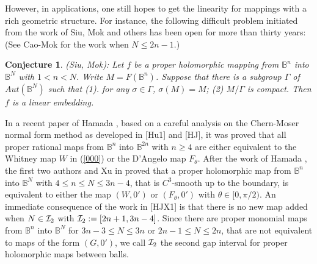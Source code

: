 \documentclass[12pt]{article}
\numberwithin{equation}{section}
\def\BB{{\mathbb B}}
\newtheorem{conjecture}[theorem]{Conjecture}
\begin{document}
However, in  applications,  one  still hopes to get the linearity
for mappings with a rich geometric structure.
For instance,  the following difficult  problem initiated from the work of Siu, Mok
\cite{Mok} and others has been open for more than thirty years: (See
Cao-Mok \cite{CMk} for the work when $N\le 2n-1$.)
\begin{conjecture} (Siu, Mok): {\it Let $f$ be a proper holomorphic
mapping from ${\BB}^n$ into ${\BB}^N$ with $ 1<n<N$. Write
$M=F({\BB}^n)$. Suppose that there is a subgroup $\Gamma$ of
$Aut({\BB}^N)$ such that (1). for any $\sigma \in \Gamma$,
$\sigma(M)=M$; (2) $M/\Gamma$ is compact. Then $f$ is  a linear
embedding.} \end{conjecture}



In a  recent  paper of Hamada \cite{Ha1}, based on a careful
analysis on the Chern-Moser normal form  method as developed in
[Hu1] and [HJ], it was proved that all proper rational  maps from
${\BB}^n$ into ${\BB}^{2n}$ with $n\ge 4$ are either equivalent to
the Whitney map $W$ in (\ref{000}) or  the D'Angelo map $F_\theta$.
After the work of Hamada  \cite{Ha1}, the first two authors and Xu
in \cite{HJX1} proved that a proper holomorphic map from ${\BB}^n$
into ${\BB}^N$ with $4\le n\leq N \leq 3n-4$, that is $C^3$-smooth
up to the boundary, is equivalent to either the map $(W,0')$ or
$(F_\theta,0')$ with $\theta\in [0,\pi/2)$.
An immediate consequence of the work in [HJX1] is that there is no
new map added  when $N\in {\cal I}_2$ with ${\cal
I}_2:=[2n+1,3n-4]$. Since there are proper  monomial maps from
${\BB}^n$ into ${\BB}^N$ for $3n-3\le N\le 3n$ or $2n-1\le N\le 2n$,
that are not equivalent to maps of the form $(G,0')$, we call ${\cal
I}_2$ the second gap interval for proper holomorphic maps between
balls.
\end{document}
